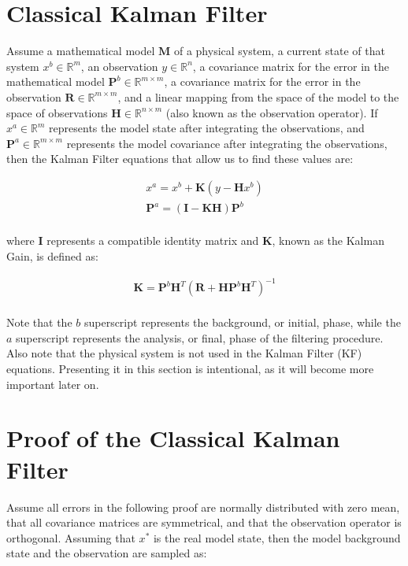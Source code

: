 \documentclass{article}
\begin{document}
\section{Classical Kalman Filter}

Assume a mathematical model $\mathbf{M}$ of a physical system, a current state of that system $x^b \in \mathbb{R}^m$, an observation $y \in \mathbb{R}^n$, a covariance matrix for the error in the mathematical model $\mathbf{P}^b \in \mathbb{R}^{m \times m}$, a covariance matrix for the error in the observation $\mathbf{R} \in \mathbb{R}^{m \times m}$, and a linear mapping from the space of the model to the space of observations $\mathbf{H} \in \mathbb{R}^{n \times m}$ (also known as the observation operator). If $x^a \in \mathbb{R}^m$ represents the model state after integrating the observations, and $\mathbf{P}^a \in \mathbb{R}^{m \times m}$ represents the model covariance after integrating the observations, then the Kalman Filter equations \cite{Mandel2009} that allow us to find these values are:

\begin{gather*}
x^a = x^b + \mathbf{K} (y - \mathbf{H} x^b) \\
\mathbf{P}^a = (\mathbf{I} - \mathbf{K} \mathbf{H}) \mathbf{P}^b \\
\end{gather*}

where $\mathbf{I}$ represents a compatible identity matrix and $\mathbf{K}$, known as the Kalman Gain, is defined as:

\begin{gather*}
\mathbf{K} = \mathbf{P}^b \mathbf{H}^T (\mathbf{R} + \mathbf{H} \mathbf{P}^b \mathbf{H}^T) ^ {-1} \\
\end{gather*}

Note that the $b$ superscript represents the background, or initial, phase, while the $a$ superscript represents the analysis, or final, phase of the filtering procedure. Also note that the physical system is not used in the Kalman Filter (KF) equations. Presenting it in this section is intentional, as it will become more important later on. \\

\section{Proof of the Classical Kalman Filter}

Assume all errors in the following proof are normally distributed with zero mean, that all covariance matrices are symmetrical, and that the observation operator is orthogonal. Assuming that $x^*$ is the real model state, then the model background state and the observation are sampled as:
\end{document}
